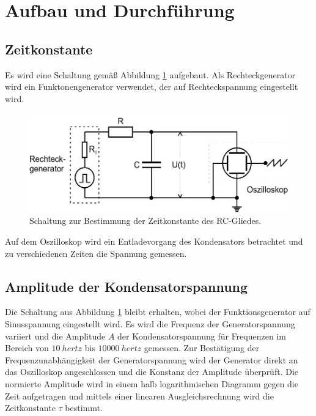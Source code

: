 \section{Aufbau und Durchführung}
\label{sec:Durchführung}
\subsection{Zeitkonstante}
Es wird eine Schaltung gemäß Abbildung \ref{fig:a}
aufgebaut. Als Rechteckgenerator wird ein Funktonengenerator verwendet, der auf Rechteckspannung eingestellt wird.
\begin{figure}
\centering
\includegraphics[width=\linewidth-70pt,height=\textheight-70pt,keepaspectratio]{content/images/a.jpg}
\caption{Schaltung zur Bestimmung der Zeitkonstante des RC-Gliedes.\cite{V353}}
\label{fig:a}
\end{figure}
\newline Auf dem Oszilloskop wird ein Entladevorgang des Kondensators betrachtet und zu verschiedenen Zeiten die Spannung gemessen.
\subsection{Amplitude der Kondensatorspannung}
Die Schaltung aus Abbildung \ref{fig:a} bleibt erhalten, wobei der Funktionsgenerator auf Sinusspannung eingestellt wird.
Es wird die Frequenz der Generatorspannung variiert und die Amplitude $A$ der Kondensatorspannung für Frequenzen im Bereich von $\SI{10}{hertz}$ bis $\SI{10000}{hertz}$ gemessen.
Zur Bestätigung der Frequenzunabhängigkeit der Generatorspannung wird der Generator direkt an das Oszilloskop angeschlossen und die Konstanz der Amplitude überprüft.
Die normierte Amplitude wird in einem halb logarithmischen Diagramm gegen die Zeit aufgetragen und mittels einer linearen Ausgleichsrechnung wird die Zeitkonstante $\tau$ bestimmt.
